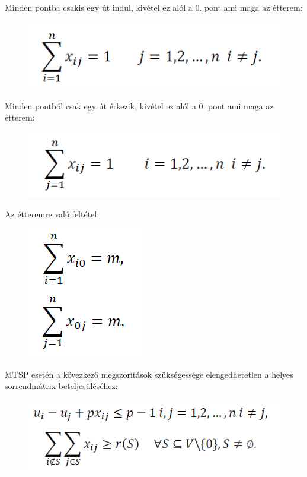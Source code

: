 Minden pontba csakis egy út indul, kivétel ez alól a 0. pont ami maga az étterem:

\begin{figure}[h!]
\centering
\includegraphics[scale=0.5]{images/mtsp2.png}
\end{figure}

Minden pontból csak egy út érkezik, kivétel ez alól a 0. pont ami maga az étterem:

\begin{figure}[h!]
\centering
\includegraphics[scale=0.5]{images/mtsp3.png}
\end{figure}

Az étteremre való feltétel:

\begin{figure}[h!]
\centering
\includegraphics[scale=0.5]{images/mtsp4.png}
\end{figure}

MTSP esetén a kövezkező megszorítások szükségessége elengedhetetlen a helyes sorrendmátrix beteljesüléséhez:

\begin{figure}[h!]
\centering
\includegraphics[scale=0.5]{images/mtsp5.png}
\end{figure}

